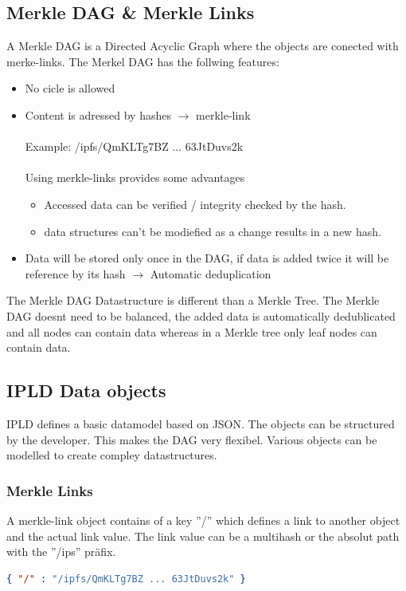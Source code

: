 \documentclass[a4paper,11pt, oneside]{report}
\theoremstyle{definition}
\begin{document}
\subsection{Merkle DAG \& Merkle Links}
A Merkle DAG is a Directed Acyclic Graph where the objects are conected with merke-links. The Merkel DAG has the follwing features:
\begin{itemize}
\item No cicle is allowed
\item Content is adressed by hashes $\rightarrow$  merkle-link\\ \\
Example:  /ipfs/QmKLTg7BZ ... 63JtDuvs2k\\ \\
Using merkle-links provides some advantages
\begin{itemize}
\item Accessed data can be verified / integrity checked by the hash.  
\item data structures can't be modiefied as a change results in a new hash.
\end{itemize}
\item Data will be stored only once in the DAG, if data is added twice it will be reference by its hash $\rightarrow$ Automatic deduplication
\end{itemize}
The Merkle DAG Datastructure is different than a Merkle Tree. The Merkle DAG doesnt need to be balanced, the added data is automatically dedublicated and all nodes can contain data whereas in a Merkle tree only leaf nodes can contain data.

\newpage

\subsection{IPLD Data objects}
IPLD defines a basic datamodel based on JSON. The objects can be structured by the developer. This makes the DAG very flexibel. Various objects can be modelled to create compley datastructures.

\subsubsection{Merkle Links}
A merkle-link object contains of a key ''/'' which defines a link to another object and the actual link value. The link value can be a multihash or the absolut path with the ''/ips'' präfix. 
\begin{lstlisting}[language=json]
{ "/" : "/ipfs/QmKLTg7BZ ... 63JtDuvs2k" }
\end{lstlisting}
\end{document}
